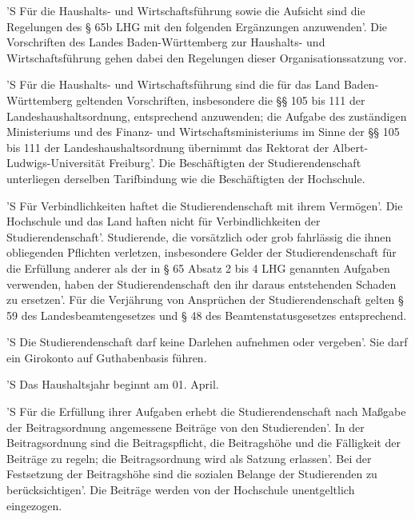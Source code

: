 \documentclass[fontsize=12pt,parskip=half]{scrartcl}
\begin{document}
\begin{contract}


  'S Für die Haushalts- und Wirtschaftsführung sowie die Aufsicht sind die
  Regelungen des § 65b LHG mit den folgenden Ergänzungen anzuwenden'. Die
  Vorschriften des Landes Baden-Württemberg zur Haushalts- und Wirtschaftsführung
  gehen dabei den Regelungen dieser Organisationssatzung vor.

  'S Für die Haushalts- und Wirtschaftsführung sind die für das Land
  Baden-Württemberg geltenden Vorschriften, insbesondere die §§ 105 bis 111 der
  Landeshaushaltsordnung, entsprechend anzuwenden; die Aufgabe des zuständigen
  Ministeriums und des Finanz- und Wirtschaftsministeriums im Sinne der §§ 105
  bis 111 der Landeshaushaltsordnung übernimmt das Rektorat der
  Albert-Ludwigs-Universität Freiburg'. Die Beschäftigten der Studierendenschaft
  unterliegen derselben Tarifbindung wie die Beschäftigten der Hochschule.

  'S Für Verbindlichkeiten haftet die Studierendenschaft mit ihrem Vermögen'. Die
  Hochschule und das Land haften nicht für Verbindlichkeiten der
  Studierendenschaft'. Studierende, die vorsätzlich oder grob fahrlässig die
  ihnen obliegenden Pflichten verletzen, insbesondere Gelder der
  Studierendenschaft für die Erfüllung anderer als der in § 65 Absatz 2 bis 4
  LHG genannten Aufgaben verwenden, haben der Studierendenschaft den ihr daraus
  entstehenden Schaden zu ersetzen'. Für die Verjährung von Ansprüchen der
  Studierendenschaft gelten § 59 des Landesbeamtengesetzes und § 48 des
  Beamtenstatusgesetzes entsprechend.

  'S Die Studierendenschaft darf keine Darlehen aufnehmen oder vergeben'. Sie darf
  ein Girokonto auf Guthabenbasis führen.



  'S Das Haushaltsjahr beginnt am 01. April.

  'S Für die Erfüllung ihrer Aufgaben erhebt die Studierendenschaft nach Maßgabe
  der Beitragsordnung angemessene Beiträge von den Studierenden'. In der
  Beitragsordnung sind die Beitragspflicht, die Beitragshöhe und die Fälligkeit
  der Beiträge zu regeln; die Beitragsordnung wird als Satzung erlassen'. Bei der
  Festsetzung der Beitragshöhe sind die sozialen Belange der Studierenden zu
  berücksichtigen'. Die Beiträge werden von der Hochschule unentgeltlich
  eingezogen.


\end{contract}
\end{document}
